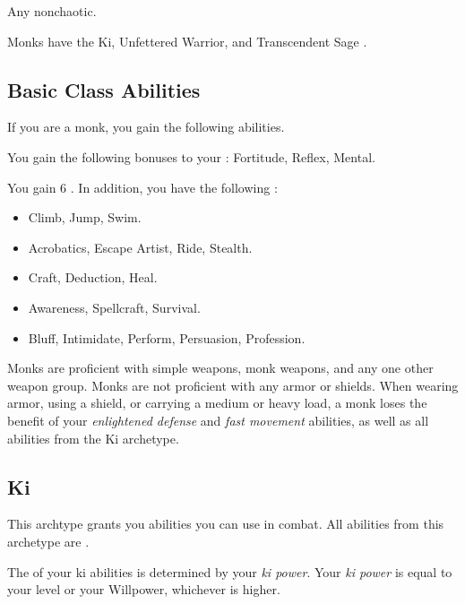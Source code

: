      Any nonchaotic.

     Monks have the Ki, Unfettered Warrior, and Transcendent Sage .

    \subsection{Basic Class Abilities}
        If you are a monk, you gain the following abilities.

        You gain the following bonuses to your :  Fortitude,  Reflex,  Mental.

        You gain 6 .
        In addition, you have the following :
        \begin{itemize}
            \item {} Climb, Jump, Swim.
            \item {} Acrobatics, Escape Artist, Ride, Stealth.
            \item {} Craft, Deduction, Heal.
            \item {} Awareness, Spellcraft, Survival.
            \item {} Bluff, Intimidate, Perform, Persuasion, Profession.
        \end{itemize}

        Monks are proficient with simple weapons, monk weapons, and any one other weapon group.
        Monks are not proficient with any armor or shields.
        When wearing armor, using a shield, or carrying a medium or heavy load, a monk loses the benefit of your \textit{enlightened defense} and \textit{fast movement} abilities, as well as all abilities from the Ki archetype.

    \subsection{Ki}
        This archtype grants you abilities you can use in combat.
        All abilities from this archetype are .

        The  of your ki abilities is determined by your \textit{ki power}.
        Your \textit{ki power} is equal to your level or your Willpower, whichever is higher.

